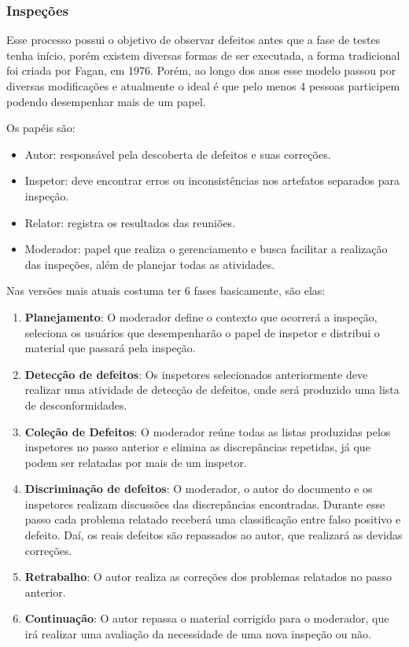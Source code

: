 \documentclass[runningheads]{llncs}
\begin{document}
\subsubsection{Inspeções}
Esse processo possui o objetivo de observar defeitos antes que a fase de testes tenha início, porém existem diversas formas de ser executada, a forma tradicional foi criada por Fagan, em 1976. Porém, ao longo dos anos esse modelo passou por diversas modificações e atualmente o ideal é que pelo menos 4 pessoas participem podendo desempenhar mais de um papel.

Os papéis são:
\begin{itemize}
    \item Autor: responsável pela descoberta de defeitos e suas correções.
    \item Inspetor: deve encontrar erros ou inconsistências nos artefatos separados para inspeção.
    \item Relator: registra os resultados das reuniões.
    \item Moderador: papel que realiza o gerenciamento e busca facilitar a realização das inspeções, além de planejar todas as atividades.
\end{itemize}

Nas versões mais atuais costuma ter 6 fases basicamente, são elas:
\begin{enumerate}
    \item \textbf{Planejamento}: O moderador define o contexto que ocorrerá a inspeção, seleciona os usuários que desempenharão o papel de inspetor e distribui o material que passará pela inspeção.
    \item \textbf{Detecção de defeitos}: Os inspetores selecionados anteriormente deve realizar uma atividade de detecção de defeitos, onde será produzido uma lista de desconformidades.
    \item \textbf{Coleção de Defeitos}: O moderador reúne todas as listas produzidas pelos inspetores no passo anterior e elimina as discrepâncias repetidas, já que podem ser relatadas por mais de um inspetor.
    \item \textbf{Discriminação de defeitos}: O moderador, o autor do documento e os inspetores realizam discussões das discrepâncias encontradas. Durante esse passo cada problema relatado receberá uma classificação entre falso positivo e defeito. Daí, os reais defeitos são repassados ao autor, que realizará as devidas correções.
    \item \textbf{Retrabalho}: O autor realiza as correções dos problemas relatados no passo anterior.
    \item \textbf{Continuação}: O autor repassa o material corrigido para o moderador, que irá realizar uma avaliação da necessidade de uma nova inspeção ou não.
\end{enumerate}
\end{document}
